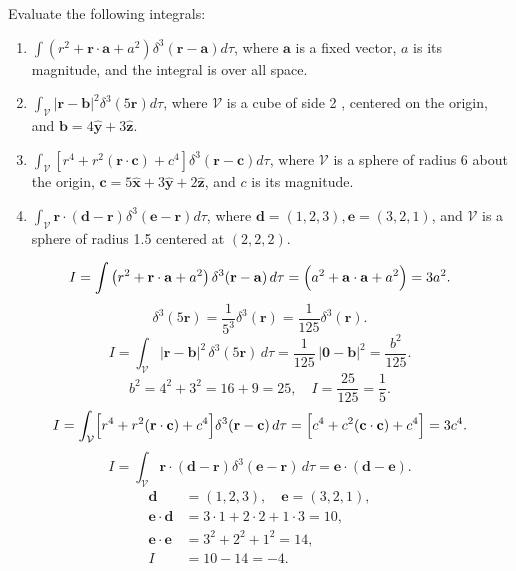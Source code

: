 \begin{hwkProblem}{1.48}{}

	Evaluate the following integrals:
	\begin{enumerate}
		\item \(\int\left(r^2+\mathbf{r} \cdot \mathbf{a}+a^2\right) \delta^3(\mathbf{r}-\mathbf{a}) d \tau\), where \(\mathbf{a}\) is a fixed vector, \(a\) is its magnitude, and the integral is over all space.
		\item \(\int_{\mathcal{V}}|\mathbf{r}-\mathbf{b}|^2 \delta^3(5 \mathbf{r}) d \tau\), where \(\mathcal{V}\) is a cube of side 2 , centered on the origin, and \(\mathbf{b}=4 \hat{\mathbf{y}}+3 \hat{\mathbf{z}}\).
		\item \(\int_{\mathcal{V}}\left[r^4+r^2(\mathbf{r} \cdot \mathbf{c})+c^4\right] \delta^3(\mathbf{r}-\mathbf{c}) d \tau\), where \(\mathcal{V}\) is a sphere of radius 6 about the origin, \(\mathbf{c}=5 \hat{\mathbf{x}}+3 \hat{\mathbf{y}}+2 \hat{\mathbf{z}}\), and \(c\) is its magnitude.
		\item \(\int_{\mathcal{V}} \mathbf{r} \cdot(\mathbf{d}-\mathbf{r}) \delta^3(\mathbf{e}-\mathbf{r}) d \tau\), where \(\mathbf{d}=(1,2,3), \mathbf{e}=(3,2,1)\), and \(\mathcal{V}\) is a sphere of radius 1.5 centered at \((2,2,2)\).
	\end{enumerate}

	\hwkSol
	\hwkPart
	\[
		I=\int\left(r^2+\mathbf{r}\cdot\mathbf{a}+a^2\right)\delta^3(\mathbf{r}-\mathbf{a})\,d\tau
		=\Bigl(a^2+\mathbf{a}\cdot\mathbf{a}+a^2\Bigr)
		=3a^2.
	\]
	\hwkPart
	\[
		\delta^3(5\mathbf{r})=\frac{1}{5^3}\delta^3(\mathbf{r})
		=\frac{1}{125}\delta^3(\mathbf{r}).
	\]
	\[
		I=\int_{\mathcal{V}}|\mathbf{r}-\mathbf{b}|^2\,\delta^3(5\mathbf{r})\,d\tau
		=\frac{1}{125}\,|\mathbf{0}-\mathbf{b}|^2
		=\frac{b^2}{125}.
	\]
	\[
		b^2=4^2+3^2=16+9=25,\quad I=\frac{25}{125}=\frac{1}{5}.
	\]
	\hwkPart
	\[
		I=\int_{\mathcal{V}}\Bigl[r^4+r^2(\mathbf{r}\cdot\mathbf{c})+c^4\Bigr]\delta^3(\mathbf{r}-\mathbf{c})\,d\tau
		=\Bigl[c^4+c^2(\mathbf{c}\cdot\mathbf{c})+c^4\Bigr]
		=3c^4.
	\]
	\hwkPart
	\[
		I=\int_{\mathcal{V}}\mathbf{r}\cdot(\mathbf{d}-\mathbf{r})\delta^3(\mathbf{e}-\mathbf{r})\,d\tau
		=\mathbf{e}\cdot(\mathbf{d}-\mathbf{e}).
	\]
	\[
		\begin{aligned}
			\mathbf{d} &= (1,2,3),\quad \mathbf{e}=(3,2,1),\\[1mm]
			\mathbf{e}\cdot\mathbf{d} &= 3\cdot1+2\cdot2+1\cdot3=10,\\[1mm]
			\mathbf{e}\cdot\mathbf{e} &= 3^2+2^2+1^2=14,\\[1mm]
			I &= 10-14=-4.
		\end{aligned}
	\]
\end{hwkProblem}

